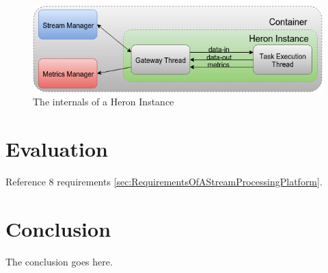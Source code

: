 \documentclass[conference]{IEEEtran}
\begin{document}
\begin{figure}[htp]
    \centering
    \includegraphics[scale=0.45]{figures/HeronInstance}
    \caption{The internals of a Heron Instance}
    \label{fig:HeronInstance}
\end{figure}

\cite{ElasticScalingStreamProcessing}
\cite{ScalableDistributedStreamProcessing}



\section{Evaluation}
\label{sec:Evaluation}


Reference 8 requirements \ref{sec:RequirementsOfAStreamProcessingPlatform}.


\section{Conclusion}
\label{sec:Conclusion}

The conclusion goes here.




\end{document}
